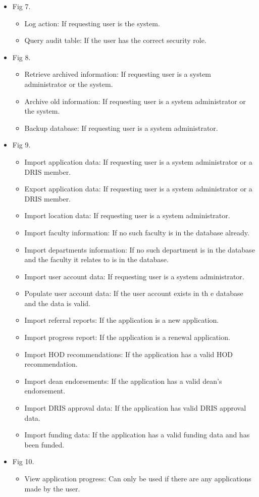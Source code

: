 \documentclass[12pt]{article}
\begin{document}
\begin{itemize}
	\item Fig 7.
		\begin{itemize}
			\item Log action: If requesting user is the system.
			\item Query audit table: If the user has the correct security role.										
		\end{itemize}
	\item Fig 8.
		\begin{itemize}
			\item Retrieve archived information: If requesting user is a system administrator or the system.
			\item Archive old information: If requesting user is a system administrator or the system.	
			\item Backup database: If requesting user is a system administrator.					
		\end{itemize}
	\item Fig 9.
		\begin{itemize}
			\item Import application data: If requesting user is a system administrator or a DRIS member.
			\item Export application data: If requesting user is a system administrator or a DRIS member.	
			\item Import location data: If requesting user is a system administrator.
			\item Import faculty information: If no such faculty is in the database already.
			\item Import departments information: If no such department is in the database and the faculty it relates to is in the database.
			\item Import user account data: If requesting user is a system administrator.
			\item Populate user account data: If the user account exists in th e database and the data is valid.
			\item Import referral reports: If the application is a new application.
			\item Import progress report: If the application is a renewal application.
			\item Import HOD recommendations: If the application has a valid HOD recommendation.
			\item Import dean endorsements: If the application has a valid dean's endorsement.
			\item Import DRIS approval data: If the application has valid DRIS approval data.
			\item Import funding data: If the application has a valid funding data and has been funded.				
		\end{itemize}		
	\item Fig 10.
		\begin{itemize}
			\item View application progress: Can only be used if there are any applications made by the user.
		\end{itemize}
		

\end{itemize}
\end{document}
